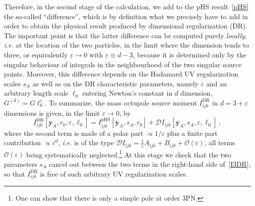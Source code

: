 \documentclass[prd,preprint,superscriptaddress,tightenlines,nofootinbib,
  eqsecnum,showpacs]{revtex4}
\begin{document}
Therefore, in the second stage of the calculation, we add to the pHS
result~\eqref{pHS} the so-called ``difference'', which is by
definition what we precisely have to add in order to obtain the
physical result produced by dimensional regularization (DR). The
important point is that the latter difference can be computed purely
\textit{locally}, \textit{i.e.} at the location of the two particles,
in the limit where the dimension tends to three, or equivalently
$\varepsilon\to 0$ with $\varepsilon \equiv d-3$, because it is
determined only by the singular behaviour of integrals in the
neighbourhood of the two singular source points. Moreover, this
difference depends on the Hadamard UV regularization scales $s_A$ as
well as on the DR characteristic parameters, namely $\varepsilon$ and
an arbitrary length scale $\ell_0$ entering Newton's constant in $d$
dimension, $G^{(d)}=G\ell_0^\varepsilon$. To summarize, the mass
octupole source moment $I_{ijk}^\text{DR}$ in $d=3+\varepsilon$
dimensions is given, in the limit $\varepsilon\to 0$, by
%
\begin{equation}\label{I3DR}
I_{ijk}^\text{DR}[\overline{\bm{y}}_A, r_0, \varepsilon, \ell_0] =
I_{ijk}^\text{pHS}[\overline{\bm{y}}_A, s_A,r_0] +
\mathcal{D}I_{ijk}[\overline{\bm{y}}_A, s_A, \varepsilon, \ell_0]\,,
\end{equation}
%
where the second term is made of a polar part $\propto 1/\varepsilon$
plus a finite part contribution $\propto \varepsilon^0$, \textit{i.e.}
is of the type $\mathcal{D}I_{ijk} = \frac{1}{\varepsilon} A_{ijk} +
B_{ijk} + \mathcal{O}\left(\varepsilon\right)$, all terms
$\mathcal{O}(\varepsilon)$ being systematically
neglected.\footnote{One can show that there is only a simple pole at
  order 3PN.} At this stage we check that the two parameters $s_A$
cancel out between the two terms in the right-hand side
of~\eqref{I3DR}, so that $I_{ijk}^\text{DR}$ is free of such arbitrary
UV regularization scales.
\end{document}
